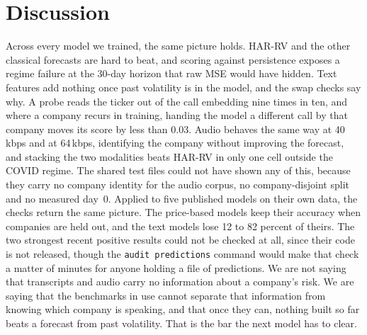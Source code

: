\section{Discussion}
\label{sec:discussion}

Across every model we trained, the same picture holds. HAR-RV and the other
classical forecasts are hard to beat, and scoring against persistence exposes a
regime failure at the 30-day horizon that raw MSE would have hidden. Text
features add nothing once past volatility is in the model, and the swap checks
say why. A probe reads the ticker out of the call embedding nine times in ten,
and where a company recurs in training, handing the model a different call by
that company moves its score by less than 0.03. Audio behaves the same way at
40\,kbps and at 64\,kbps, identifying the company without improving the forecast,
and stacking the two modalities beats HAR-RV in only one cell outside the COVID
regime. The shared test files could not have shown any of this, because they
carry no company identity for the audio corpus, no company-disjoint split and no
measured day~0. Applied to five published models on their own data, the checks
return the same picture. The price-based models keep their accuracy when
companies are held out, and the text models lose 12 to 82 percent of theirs. The
two strongest recent positive results \citep{soundofrisk2025,cao2024ecc} could
not be checked at all, since their code is not released, though the
\texttt{audit predictions} command would make that check a matter of minutes for
anyone holding a file of predictions. We are not saying that transcripts and
audio carry no information about a company's risk. We are saying that the
benchmarks in use cannot separate that information from knowing which company is
speaking, and that once they can, nothing built so far beats a forecast from past
volatility. That is the bar the next model has to clear.
